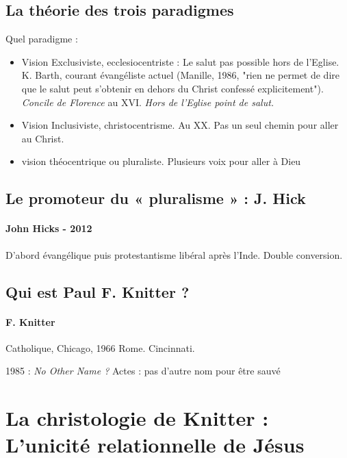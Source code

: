 \subsection{La théorie des trois paradigmes}
  Quel paradigme : 
\begin{itemize}
    \item Vision Exclusiviste, ecclesiocentriste : Le salut pas possible hors de l'Eglise. K. Barth, courant évangéliste actuel (Manille, 1986, "rien ne permet de dire que le salut peut s'obtenir en dehors du Christ confessé explicitement"). \textit{Concile de Florence} au XVI. \textit{Hors de l'Eglise point de salut. }
    \item Vision Inclusiviste, christocentrisme. Au XX. Pas un seul chemin pour aller au Christ.
\item vision théocentrique ou pluraliste. Plusieurs voix pour aller à Dieu
    
\end{itemize}

\subsection{Le promoteur du « pluralisme » : J. Hick}

 \paragraph{John Hicks - 2012} D'abord évangélique puis protestantisme libéral après l'Inde. Double conversion. 

\subsection{Qui est Paul F. Knitter ?}
 
\paragraph{F. Knitter} Catholique, Chicago, 1966 Rome. Cincinnati. 

1985 : \textit{No Other Name ? } Actes : pas d'autre nom pour être sauvé 


\section{La christologie de Knitter : L’unicité relationnelle de Jésus}



